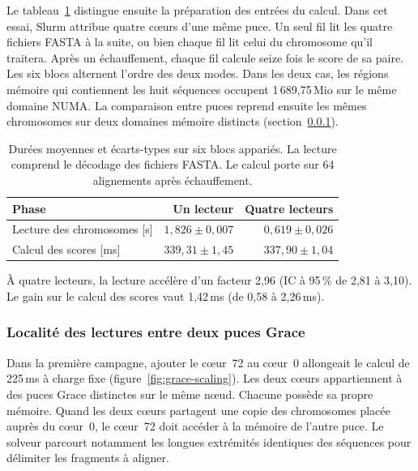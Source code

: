 Le tableau~\ref{tab:grace-read} distingue ensuite la préparation des entrées du calcul. Dans cet essai, Slurm attribue quatre cœurs d’une même puce. Un seul fil lit les quatre fichiers FASTA à la suite, ou bien chaque fil lit celui du chromosome qu’il traitera. Après un échauffement, chaque fil calcule seize fois le score de sa paire. Les six blocs alternent l’ordre des deux modes. Dans les deux cas, les régions mémoire qui contiennent les huit séquences occupent 1\,689,75\,Mio sur le même domaine NUMA. La comparaison entre puces reprend ensuite les mêmes chromosomes sur deux domaines mémoire distincts (section~\ref{sec:grace-numa}).
\begin{table}[htbp]\centering\small
\caption{Durées moyennes et écarts-types sur six blocs appariés. La lecture comprend le décodage des fichiers FASTA. Le calcul porte sur 64 alignements après échauffement.}\label{tab:grace-read}
\begin{tabular}{@{}lrr@{}}\toprule
Phase & Un lecteur & Quatre lecteurs \\ \midrule
Lecture des chromosomes [s] & \(1{,}826\pm0{,}007\) & \(0{,}619\pm0{,}026\) \\
Calcul des scores [ms] & \(339{,}31\pm1{,}45\) & \(337{,}90\pm1{,}04\) \\ \bottomrule
\end{tabular}
\end{table}
À quatre lecteurs, la lecture accélère d’un facteur 2,96 (IC à 95\,\% de 2,81 à 3,10). Le gain sur le calcul des scores vaut 1,42\,ms (de 0,58 à 2,26\,ms).
\FloatBarrier
{}

\subsubsection{Localité des lectures entre deux puces Grace}\label{sec:grace-numa}
Dans la première campagne, ajouter le cœur~72 au cœur~0 allongeait le calcul de 225\,ms à charge fixe (figure~\ref{fig:grace-scaling}). Les deux cœurs appartiennent à des puces Grace distinctes sur le même nœud. Chacune possède sa propre mémoire. Quand les deux cœurs partagent une copie des chromosomes placée auprès du cœur~0, le cœur~72 doit accéder à la mémoire de l’autre puce. Le solveur parcourt notamment les longues extrémités identiques des séquences pour délimiter les fragments à aligner.

